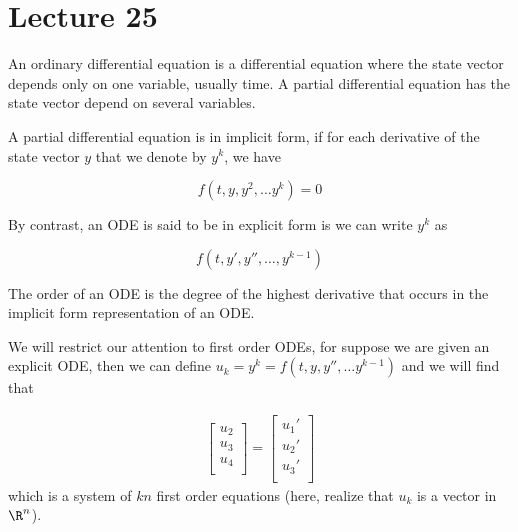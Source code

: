 \documentclass[../main.tex]{subfiles}
\begin{document}
\section{Lecture 25}
\begin{definition}
    An ordinary differential equation is a differential equation where the state vector
    depends only on one variable, usually time. A partial differential equation has the
    state vector depend on several variables.
\end{definition}

\begin{definition}
    A partial differential equation is in implicit form, if for each derivative of the state
    vector $y$ that we denote by $y^k$, we have

    \[
        f(t, y,  y^2, \dots y^k) = 0
    \]

    By contrast, an ODE is said to be in explicit form is we can write $y^k$ as

    \[
        f(t, y', y'', \dots ,y^{k-1})
    \]

    
\end{definition}

\begin{definition}
    The order of an ODE is the degree of the highest derivative that occurs in the implicit
    form representation of an ODE.
\end{definition}

\begin{remark}
    We will restrict  our attention to first order ODEs, for suppose we are given an explicit ODE, then we can define $u_k = y^{k} = f(t, y, y'', \dots y^{k-1})$ and we will find that

    \begin{align*}
        \begin{bmatrix}
            u_2 \\
            u_3 \\
            u_4 \\
        \end{bmatrix}
        =
        \begin{bmatrix}
            u_1' \\
            u_2' \\
            u_3' \\
        \end{bmatrix}
    \end{align*}
    which is a system of $kn$ first order equations (here, realize that $u_k$ is a vector in $\R^n$).
\end{remark}
\end{document}
